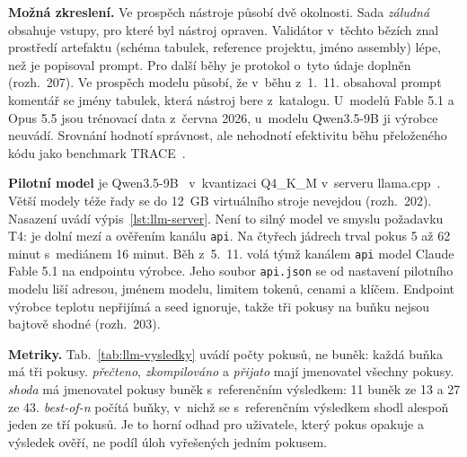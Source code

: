 \textbf{Možná zkreslení.} Ve prospěch nástroje působí dvě okolnosti. Sada \emph{záludná} obsahuje vstupy, pro které byl nástroj opraven. Validátor v~těchto bězích znal prostředí artefaktu (schéma tabulek, reference projektu, jméno assembly) lépe, než je popisoval prompt. Pro další běhy je protokol o~tyto údaje doplněn (rozh.~207). Ve prospěch modelu působí, že v~běhu z~1.~11. obsahoval prompt komentář se jmény tabulek, která nástroj bere z~katalogu. U~modelů Fable 5.1 a Opus 5.5 jsou trénovací data z~června 2026, u~modelu Qwen3.5-9B ji výrobce neuvádí. Srovnání hodnotí správnost, ale nehodnotí efektivitu běhu přeloženého kódu jako benchmark TRACE~\cite{trace}.

\textbf{Pilotní model} je Qwen3.5-9B~\cite{qwen} v~kvantizaci Q4\_K\_M v~serveru llama.cpp~\cite{llamacpp}. Větší modely téže řady se do 12~GB virtuálního stroje nevejdou (rozh.~202). Nasazení uvádí výpis~\ref{lst:llm-server}. Není to silný model ve smyslu požadavku T4: je dolní mezí a ověřením kanálu \texttt{api}. Na čtyřech jádrech trval pokus 5 až 62 minut s~mediánem 16 minut. Běh z~5.~11. volá týmž kanálem \texttt{api} model Claude Fable 5.1 na endpointu výrobce. Jeho soubor \texttt{api.json} se od nastavení pilotního modelu liší adresou, jménem modelu, limitem tokenů, cenami a klíčem. Endpoint výrobce teplotu nepřijímá a seed ignoruje, takže tři pokusy na buňku nejsou bajtově shodné (rozh.~203).

\textbf{Metriky.} Tab.~\ref{tab:llm-vysledky} uvádí počty pokusů, ne buněk: každá buňka má tři pokusy. \emph{přečteno}, \emph{zkompilováno} a \emph{přijato} mají jmenovatel všechny pokusy. \emph{shoda} má jmenovatel pokusy buněk s~referenčním výsledkem: 11 buněk ze 13 a 27 ze 43. \emph{best-of-n} počítá buňky, v~nichž se s~referenčním výsledkem shodl alespoň jeden ze tří pokusů. Je to horní odhad pro uživatele, který pokus opakuje a výsledek ověří, ne podíl úloh vyřešených jedním pokusem.

